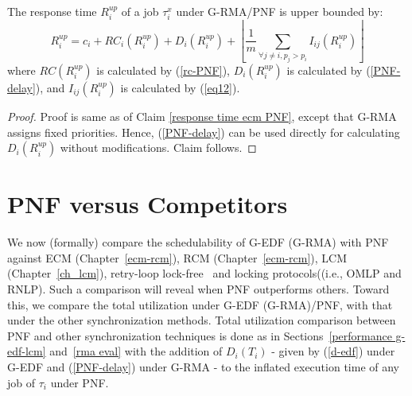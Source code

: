 %
\begin{clm}\label{response rcm PNF}
%
The response time $R_i^{up}$ of a job $\tau_{i}^{x}$ under G-RMA/PNF is upper bounded by:
% 
\begin{equation}
R_{i}^{up}=c_{i}+RC_i(R_i^{up})+D_i(R_i^{up})+\left\lfloor \frac{1}{m}\sum_{\forall j\ne i,p_j>p_i}I_{ij}(R_{i}^{up})\right\rfloor 
\end{equation}
%
where $RC(R_i^{up})$ is calculated by (\ref{rc-PNF}), $D_i(R_i^{up})$
is calculated by (\ref{PNF-delay}), and $I_{ij}(R_{i}^{up})$
is calculated by (\ref{eq12}).
\end{clm}
%
\begin{proof}\normalfont
Proof is same as of Claim \ref{response time ecm PNF}, 
except that G-RMA assigns fixed priorities. Hence, (\ref{PNF-delay}) can be used directly for calculating $D_i(R_i^{up})$ without modifications. Claim follows.
\end{proof}
%
\section{PNF versus Competitors}
\label{sec:pnf-sched-comparison}
%
We now (formally) compare the schedulability of G-EDF (G-RMA) with PNF against ECM (Chapter~\ref{ecm-rcm}), RCM (Chapter~\ref{ecm-rcm}), LCM (Chapter~\ref{ch_lcm}), retry-loop lock-free~\cite{key-5} and locking protocols((i.e., OMLP\cite{springerlink:10.1007/s10617-012-9090-1,key-3} and RNLP\cite{6257574}). Such a comparison will reveal when PNF outperforms others. Toward this, we compare the total utilization under G-EDF (G-RMA)/PNF, with that under the other synchronization methods. Total utilization comparison between PNF and other synchronization techniques is done as in Sections~\ref{performance g-edf-lcm} and~\ref{rma eval} with the addition of $D_i(T_i)$ - given by (\ref{d-edf}) under G-EDF and (\ref{PNF-delay}) under G-RMA - to the inflated execution time of any job of $\tau_i$ under PNF.
%
